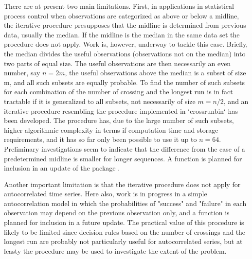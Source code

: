 There are at present two main limitations. First, in applications in statistical process control when observations are categorized as above or below a midline, the iterative procedure presupposes that the midline is determined from previous data, usually the median. If the midline is the median in the same data set the procedure does not apply. Work is, however, underway to tackle this case. Briefly, the median divides the useful observations (observations not on the median) 
into two parts of equal size. The useful observations are then necessarily an even number, say $n=2m$,  the useful observations above the median is a subset of size m, and all such subsets are equally probable. To find the number of such subsets for each combination of the number of crossing and the longest run is in fact tractable if it is generalized to all subsets, not necessarily of size $m=n/2$, and an iterative procedure resembling the procedure implemented in `crossrunbin` has been developed. The procedure has, due to the large number of such subsets, higher algorithmic complexity in terms if computation time and storage requirements, and it has so far only been possible to use it up to $n=64$.
Preliminary investigations seem to indicate that the difference from the case of a predetermined midline is smaller for longer sequences. A function  is planned for inclusion in an update of the package . 

Another important limitation is that the iterative procedure does not apply for autocorrelated time series. Here also, work is in progress in a simple autocorrelation model in which the probabilities of "success" and "failure" in each observation may depend on the previous observation only, and a function  is planned for inclusion in a future update. The practical value of this procedure is likely to be limited  since decision rules based on the number of crossings and the longest run are probably not particularly useful for autocorrelated series, but at leasty the procedure may be used to investigate the extent of the problem.

